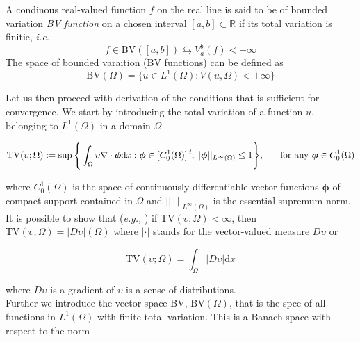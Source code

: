 \documentclass[11pt,a4paper,headinclude=true,DIV=14,BCOR=8mm,chapterprefix,listof=totoc,twoside,openright,abstracton]{scrbook}
\begin{document}
\begin{sidenote}
    A condinous real-valued function $f$ on the real line is said to be of bounded variation \textit{BV function} on a chosen interval $[a, b]\subset \mathbb{R}$ if its total variation is finitie, \textit{i.e.,}
    \begin{equation}
        f\in\text{BV}([a,b]) \leftrightarrows V_a ^b (f) < +\infty
    \end{equation}
    The space of bounded varaition (BV functions) can be defined as 
    \begin{equation}
        \text{BV}(\Omega) = \{u\in L^1(\Omega): V(u, \Omega) < +\infty\}
    \end{equation}
\end{sidenote}

Let us then proceed with derivation of the conditions that is sufficient for convergence. We start by introducing the total-variation of a function $u$, belonging to $L^1(\Omega)$ in a domain $\Omega$

\begin{equation}
    \text{TV}(\upsilon;\Omega):=\sup\Bigg\{ \int_{\Omega} \upsilon\nabla\cdot\boldsymbol{\phi}\text{d}x: \boldsymbol{\phi}\in [C_0 ^1 (\Omega)]^d, ||\boldsymbol{\phi}||_{L^{\infty}(\Omega)}\leq 1 \Bigg\}, \hspace{5mm} \text{ for any }\boldsymbol{\phi} \in C_0 ^1 (\Omega)
\end{equation}

where $C_0 ^1(\Omega)$ is the space of continuously differentiable vector functions $\boldsymbol{\phi}$ of compact support contained in $\Omega$ and $||\cdot||_{L^{\infty}(\Omega)}$ is the essential supremum norm. \\

It is possible to show that (\textit{e.g.,} \cite{Luigi:2002}) if $\text{TV}(\upsilon ; \Omega) < \infty$, then $\text{TV}(\upsilon ; \Omega) = |D\upsilon|(\Omega)$ where $|\cdot|$ stands for the vector-valued measure $D\upsilon$ or 

\begin{equation}
    \text{TV}(\upsilon; \Omega) = \int_{\Omega}|D\upsilon|\text{d}x
\end{equation}

where $D\upsilon$ is a gradient of $\upsilon$ is a sense of distributions. \\
Further we introduce the vector space BV, $\text{BV}(\Omega)$, that is the spce of all functions in $L^1(\Omega)$ with finite total variation. This is a Banach space with respect to the norm 
\end{document}
